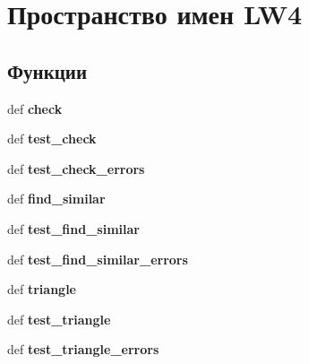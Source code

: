 \hypertarget{namespace_l_w4}{
\section{Пространство имен LW4}
\label{namespace_l_w4}
}
\subsection*{Функции}
\begin{CompactItemize}
\item 
\hypertarget{namespace_l_w4_3e942b3aa170cb809e3ea2ddebbfc1c1}{
def \textbf{check}}
\label{namespace_l_w4_3e942b3aa170cb809e3ea2ddebbfc1c1}

\item 
\hypertarget{namespace_l_w4_872d7e851c58008923745085c60f43d5}{
def \textbf{test\_\-check}}
\label{namespace_l_w4_872d7e851c58008923745085c60f43d5}

\item 
\hypertarget{namespace_l_w4_92c4251f9e371c698e6a9890bc919ef3}{
def \textbf{test\_\-check\_\-errors}}
\label{namespace_l_w4_92c4251f9e371c698e6a9890bc919ef3}

\item 
\hypertarget{namespace_l_w4_aedf7c85cc45c128722e2fc18e1149c1}{
def \textbf{find\_\-similar}}
\label{namespace_l_w4_aedf7c85cc45c128722e2fc18e1149c1}

\item 
\hypertarget{namespace_l_w4_49d94db213543dad3a73242fcc44e271}{
def \textbf{test\_\-find\_\-similar}}
\label{namespace_l_w4_49d94db213543dad3a73242fcc44e271}

\item 
\hypertarget{namespace_l_w4_09b8b177f691733d5127814d53b9575c}{
def \textbf{test\_\-find\_\-similar\_\-errors}}
\label{namespace_l_w4_09b8b177f691733d5127814d53b9575c}

\item 
\hypertarget{namespace_l_w4_091d1bf6ed268b566a38b7865394d0ec}{
def \textbf{triangle}}
\label{namespace_l_w4_091d1bf6ed268b566a38b7865394d0ec}

\item 
\hypertarget{namespace_l_w4_4c6675e0d16da48871f516d302e05b1f}{
def \textbf{test\_\-triangle}}
\label{namespace_l_w4_4c6675e0d16da48871f516d302e05b1f}

\item 
\hypertarget{namespace_l_w4_4bac326c9deae6369695c12448c9154a}{
def \textbf{test\_\-triangle\_\-errors}}
\label{namespace_l_w4_4bac326c9deae6369695c12448c9154a}


\end{CompactItemize}

